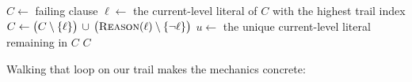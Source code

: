\begin{algorithm}[htbp]
\caption{First-UIP conflict analysis ()}
\label{alg:uip}
\begin{algorithmic}[1]
\State $C \gets$ failing clause 
  \State $\ell \gets$ the current-level literal of $C$ with the highest trail index
  \State $C \gets \big(C \setminus \{\ell\}\big) \,\cup\, \big(\textsc{Reason}(\ell) \setminus \{\lnot\ell\}\big)$ 
\EndWhile
\State $u \gets$ the unique current-level literal remaining in $C$ 
\State \Return $C$ 
\end{algorithmic}
\end{algorithm}

Walking that loop on our trail makes the mechanics concrete:

